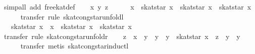 \begin{isabellebody}
\isamarkupfalse%
\ {}simp{}all\ add{}\ free{}kat{}def{}\isanewline
\ \ \isamarkupfalse%
\ x\ y\ z\isanewline
\ \ \isamarkupfalse%
\ {}{}\ {}\ x\ {}\ skat{}star\ x\ {}\ skat{}star\ x\ {}\ skat{}star\ x{}\isanewline
\ \ \ \ \isamarkupfalse%
\ {}transfer{}\ rule\ skat{}cong{}star{}unfoldl{}\isanewline
\ \ \isamarkupfalse%
\ {}{}\ {}\ skat{}star\ x\ {}\ x\ {}\ skat{}star\ x\ {}\ skat{}star\ x{}\isanewline
\ \ \ \ \isamarkupfalse%
\ {}transfer{}\ rule\ skat{}cong{}star{}unfoldr{}\isanewline
\ \ \isamarkupfalse%
\ {}z\ {}\ x\ {}\ y\ {}\ y\ {}\ y\ {}\ skat{}star\ x\ {}\ z\ {}\ y\ {}\ y{}\isanewline
\ \ \ \ \isamarkupfalse%
\ {}transfer{}\ metis\ skat{}cong{}star{}inductl{}\isanewline

\end{isabellebody}
